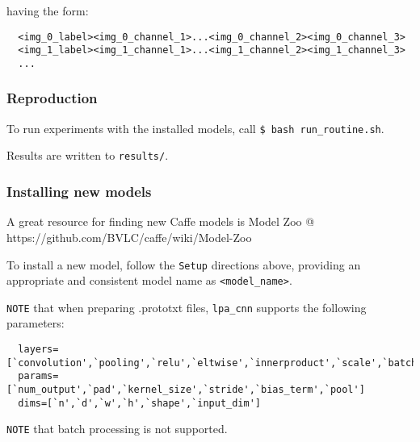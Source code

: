having the form:

\begin{verbatim}
  <img_0_label><img_0_channel_1>...<img_0_channel_2><img_0_channel_3>
  <img_1_label><img_1_channel_1>...<img_1_channel_2><img_1_channel_3>
  ...
\end{verbatim}

\subsubsection{\texorpdfstring{Reproduction}{Reproduction}}\label{reproduction}

To run experiments with the installed models, call
\texttt{\$\ bash\ run\_routine.sh}.

Results are written to \texttt{results/}.

\subsubsection{\texorpdfstring{Installing new
models}{Installing new models}}\label{installing-new-models}

A great resource for finding new Caffe models is Model Zoo @
https://github.com/BVLC/caffe/wiki/Model-Zoo

To install a new model, follow the \texttt{Setup} directions above,
providing an appropriate and consistent model name as
\texttt{\textless{}model\_name\textgreater{}}.

\texttt{NOTE} that when preparing .prototxt files, \texttt{lpa\_cnn}
supports the following parameters:

\begin{verbatim}
  layers=[`convolution',`pooling',`relu',`eltwise',`innerproduct',`scale',`batchnorm']
  params=[`num_output',`pad',`kernel_size',`stride',`bias_term',`pool']
  dims=[`n',`d',`w',`h',`shape',`input_dim']
\end{verbatim}

\texttt{NOTE} that batch processing is not supported.
